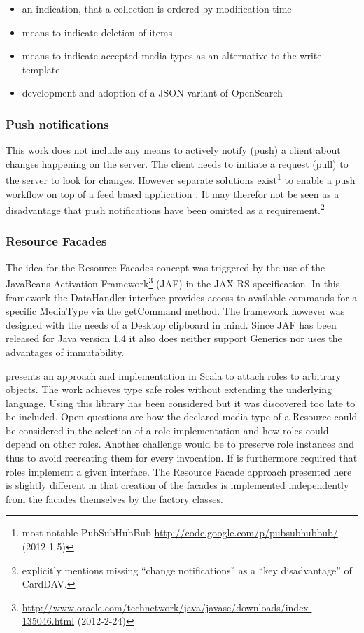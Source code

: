 \documentclass[11pt,a4paper,headsepline,twoside]{scrartcl}		%
\newcommand{\citeurl}[2]{\url{#1} (#2)}
\begin{document}
\begin{itemize}
\item an indication, that a collection is ordered by modification time
\item means to indicate deletion of items
\item means to indicate accepted media types as an alternative to the write
  template
\item development and adoption of a JSON variant of OpenSearch
\end{itemize}


\subsubsection{Push notifications}

This work does not include any means to actively notify (push) a client about
changes happening on the server. The client needs to initiate a request (pull)
to the server to look for changes. However separate solutions
exist\footnote{most notable PubSubHubBub
  \citeurl{http://code.google.com/p/pubsubhubbub/}{2012-1-5}} to enable a push
workflow on top of a feed based
application \cite{Wilde:2009:FQP:1693155.1693220}. It may therefor not be seen as
a disadvantage that push notifications have been omitted as a
requirement.\footnote{\cite[sec. 1]{RFC6352} explicitly mentions missing
  ``change notifications'' as a ``key disadvantage'' of CardDAV.}

\subsubsection{Resource Facades}
\label{sec:resourcefacadesfuture-work}

The idea for the Resource Facades concept was triggered by the use of the
JavaBeans Activation
Framework\footnote{\citeurl{http://www.oracle.com/technetwork/java/javase/downloads/index-135046.html}{2012-2-24}}
(JAF) in the JAX-RS specification. In this framework the DataHandler interface
provides access to available commands for a specific MediaType via the
getCommand method. The framework however was designed with the needs of a
Desktop clipboard in mind. Since JAF has been released for Java version 1.4 it
also does neither support Generics nor uses the advantages of immutability.

\cite{Pradel2008a} presents an approach and implementation in Scala to attach
roles to arbitrary objects. The work achieves type safe roles without extending
the underlying language. Using this library has been considered but it was
discovered too late to be included. Open questions are how the declared media
type of a Resource could be considered in the selection of a role implementation
and how roles could depend on other roles. Another challenge would be to
preserve role instances and thus to avoid recreating them for every
invocation. If is furthermore required that roles implement a given
interface. The Resource Facade approach presented here is slightly different in
that creation of the facades is implemented independently from the facades
themselves by the factory classes.
\end{document}
